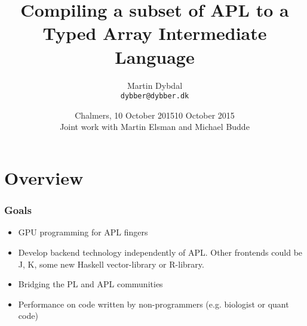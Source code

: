 \documentclass{beamer}
\title[APL \& TAIL] %
  {Compiling a subset of APL to a \\ Typed Array Intermediate Language} %
\author{\footnotesize{Martin Dybdal} \\ \footnotesize{\texttt{dybber@dybber.dk}}}
\institute {
HIPERFIT \\
DIKU \\
University of Copenhagen
}
\date{\footnotesize{Chalmers, 10 October 2015}}
\date[10 October 2015]{10 October 2015 \\ \vspace{1cm} \footnotesize{Joint work with Martin Elsman and Michael Budde}}
\begin{document}
{
\begin{frame}
\titlepage
\end{frame}
}





\section{Overview}

\begin{frame}
\frametitle{Goals}
\begin{itemize}
\item GPU programming for APL fingers
\item Develop backend technology independently of APL. Other frontends
  could be J, K, some new Haskell vector-library or R-library.
\item Bridging the PL and APL communities
\item Performance on code written by non-programmers (e.g. biologist
  or quant code)
\end{itemize}

\end{frame}
\end{document}
